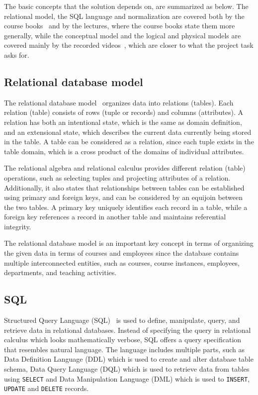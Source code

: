 \documentclass[a4paper]{scrartcl}
\renewcommand{\_}{\textunderscore\allowbreak}
\begin{document}
The basic concepts that the solution depends on, are summarized as below. The relational model, the SQL language and normalization are covered both by the course books~\cite{elmasri,silberschatz} and by the lectures, where the course books state them more generally, while the conceptual model and the logical and physical models are covered mainly by the recorded videos~\cite{conceptuallecture,logicallecture}, which are closer to what the project task asks for.

\subsection{Relational database model}

The relational database model~\cite{elmasri,silberschatz} organizes data into relations (tables). Each relation (table) consists of rows (tuple or records) and columns (attributes). A relation has both an intentional state, which is the same as domain definition, and an extensional state, which describes the current data currently being stored in the table. A table can be considered as a relation, since each tuple exists in the table domain, which is a cross product of the domains of individual attributes.

The relational algebra and relational calculus provides different relation (table) operations, such as selecting tuples and projecting attributes of a relation. Additionally, it also states that relationships between tables can be established using primary and foreign keys, and can be considered by an equijoin between the two tables. A primary key uniquely identifies each record in a table, while a foreign key references a record in another table and maintains referential integrity.

The relational database model is an important key concept in terms of organizing the given data in terms of courses and employees since the database contains multiple interconnected entities, such as courses, course instances, employees, departments, and teaching activities.

\subsection{SQL}
Structured Query Language (SQL)~\cite{elmasri,silberschatz} is used to define, manipulate, query, and retrieve data in relational databases. Instead of specifying the query in relational calculus which looks mathematically verbose, SQL offers a query specification that resembles natural language. The language includes multiple parts, such as Data Definition Language (DDL) which is used to create and alter database table schema, Data Query Language (DQL) which is used to retrieve data from tables using \texttt{SELECT} and Data Manipulation Language (DML) which is used to \texttt{INSERT}, \texttt{UPDATE} and \texttt{DELETE} records.
\end{document}
